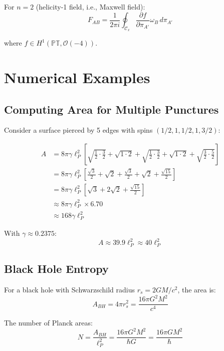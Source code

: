 \documentclass[12pt,a4paper]{article}
\theoremstyle{definition}
\begin{document}
For $n=2$ (helicity-1 field, i.e., Maxwell field):
\begin{equation}
F_{AB} = \frac{1}{2\pi i}\oint_{\mathcal{C}_x} \frac{\partial f}{\partial \pi_{A'}}\omega_B \, d\pi_{A'}
\end{equation}

where $f \in H^1(\mathbb{PT}, \mathcal{O}(-4))$.

\section{Numerical Examples}

\subsection{Computing Area for Multiple Punctures}

Consider a surface pierced by 5 edges with spins $(1/2, 1, 1/2, 1, 3/2)$:

\begin{align}
A &= 8\pi\gamma\ell_P^2\left[\sqrt{\frac{1}{2}\cdot\frac{3}{2}} + \sqrt{1\cdot 2} + \sqrt{\frac{1}{2}\cdot\frac{3}{2}} + \sqrt{1\cdot 2} + \sqrt{\frac{3}{2}\cdot\frac{5}{2}}\right] \\
&= 8\pi\gamma\ell_P^2\left[\frac{\sqrt{3}}{2} + \sqrt{2} + \frac{\sqrt{3}}{2} + \sqrt{2} + \frac{\sqrt{15}}{2}\right] \\
&= 8\pi\gamma\ell_P^2\left[\sqrt{3} + 2\sqrt{2} + \frac{\sqrt{15}}{2}\right] \\
&\approx 8\pi\gamma\ell_P^2 \times 6.70 \\
&\approx 168\gamma\ell_P^2
\end{align}

With $\gamma \approx 0.2375$:
\begin{equation}
A \approx 39.9\ell_P^2 \approx 40\ell_P^2
\end{equation}

\subsection{Black Hole Entropy}

For a black hole with Schwarzschild radius $r_s = 2GM/c^2$, the area is:
\begin{equation}
A_{BH} = 4\pi r_s^2 = \frac{16\pi G^2 M^2}{c^4}
\end{equation}

The number of Planck areas:
\begin{equation}
N = \frac{A_{BH}}{\ell_P^2} = \frac{16\pi G^2 M^2}{\hbar G} = \frac{16\pi GM^2}{\hbar}
\end{equation}
\end{document}
